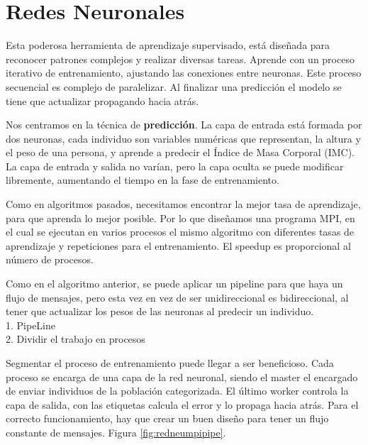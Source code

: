 	
	
	
	


\section{Redes Neuronales}
\label{sec:redes_neu}	
	Esta poderosa herramienta de aprendizaje supervisado, está diseñada para reconocer patrones complejos y realizar diversas tareas. Aprende con un proceso iterativo de entrenamiento, ajustando las conexiones entre neuronas. Este proceso secuencial es complejo de paralelizar. Al finalizar una predicción el modelo se tiene que actualizar propagando hacia atrás.
	
	Nos centramos en la técnica de \textbf{predicción}. La capa de entrada está formada por dos neuronas, cada individuo son variables numéricas que representan, la altura y el peso de una persona, y aprende a predecir el Índice de Masa Corporal (IMC). La capa de entrada y salida no varían, pero la capa oculta se puede modificar libremente, aumentando el tiempo en la fase de entrenamiento.
	
	
	Como en algoritmos pasados, necesitamos encontrar la mejor tasa de aprendizaje, para que aprenda lo mejor posible. Por lo que diseñamos una programa MPI, en el cual se ejecutan en varios procesos el mismo algoritmo con diferentes tasas de aprendizaje y repeticiones para el entrenamiento. El speedup es proporcional al número de procesos.
	
	\begin{flushleft}
		Como en el algoritmo anterior, se puede aplicar un pipeline para que haya un flujo de mensajes, pero esta vez en vez de ser unidireccional es bidireccional, al tener que actualizar los pesos de las neuronas al predecir un individuo.\\	
		1. PipeLine\\
		2. Dividir el trabajo en procesos
	\end{flushleft}
	
	Segmentar el proceso de entrenamiento puede llegar a ser beneficioso. Cada proceso se encarga de una capa de la red neuronal, siendo el master el encargado de enviar individuos de la población categorizada. El último worker controla la capa de salida, con las etiquetas calcula el error y lo propaga hacia atrás. Para el correcto funcionamiento, hay que crear un buen diseño para tener un flujo constante de mensajes. Figura \ref{fig:redneumpipipe}.
	
	
	
